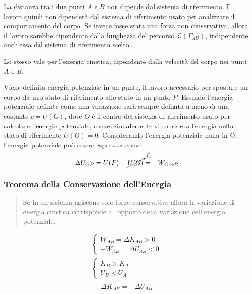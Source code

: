\documentclass{article}
\numberwithin{equation}{subsection}
\begin{document}
La  distanza tra i due punti $A$ e $B$ non dipende dal sistema di 
riferimento. 
Il lavoro quindi non dipenderà dal sistema di riferimento usato per 
analizzare il comportamento del corpo. 
Se invece fosse stata una forza non conservativa, allora il 
lavoro sarebbe dipendente dalla lunghezza del percorso $\mathscr{L} (\Gamma_{AB})$, 
indipendente anch'essa dal sistema di riferimento scelto.



Lo stesso vale per l'energia cinetica, dipendente dalla velocità 
del corpo nei punti $A$ e $B$.


Viene definita energia potenziale in un punto, il lavoro necessario per spostare un corpo da uno stato di riferimento allo stato in un punto $P$. Essendo l'energia potenziale 
definita come una variazione sarà sempre definita a meno di una costante $c=U(O)$, dove $O$ è il centro del sistema di riferimento usato per calcolare l'energia potenziale, 
convenzionalemente si considera l'energia nello stato di riferimento $U(O)=0$. Considerando l'energia potenziale nulla in O, l'energia potenziale può essere espresssa come: 
\begin{equation}
    \Delta U_{OP}=U(P)-\cancelto{0}{U(O)}=-W_{O\to P}
\end{equation} 

\subsubsection{Teorema della Conservazione dell'Energia}
\begin{quotation}
    Se in un sistema agiscono solo forze conservative allora la variazione di energia cinetica corrisponde all'opposto della variazione dell'energia potenziale. 
\end{quotation}

\begin{gather*}
    \begin{cases}
       W_{AB}=\Delta K_{AB}>0\\
      -W_{AB}=\Delta U_{AB}<0
    \end{cases}\\
    \begin{cases}
        K_B>K_A\\
        U_B<U_A
     \end{cases}\\
\end{gather*}
\begin{equation}
    \Delta K_{AB}=-\Delta U_{AB}
\end{equation}
\end{document}
